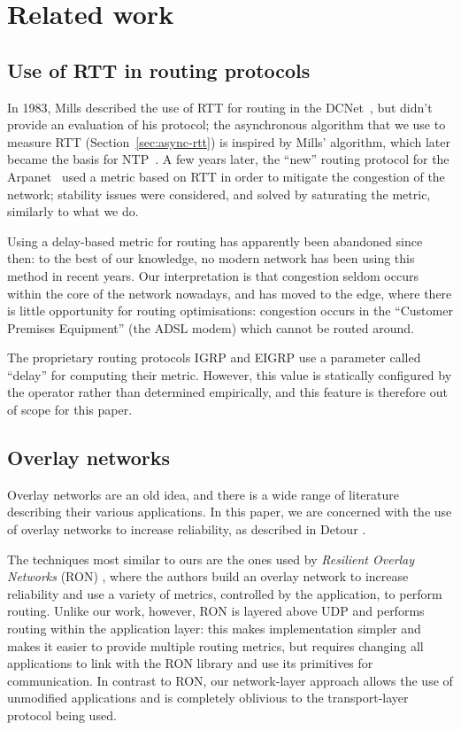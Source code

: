 \documentclass[conference,letterpaper]{IEEEtran}
\begin{document}
\section{Related work}

\subsection{Use of RTT in routing protocols}

In 1983, Mills described the use of RTT for routing in the
DCNet~\cite{mills83}, but didn't provide an evaluation of his
protocol; the asynchronous algorithm that we use to measure RTT
(Section~\ref{sec:async-rtt}) is inspired by Mills' algorithm, which
later became the basis for NTP~\cite{NTPv4}.  A few years later, the
``new'' routing protocol for the Arpanet~\cite{arpanet89} used
a metric based on RTT in order to mitigate the congestion of the
network; stability issues were considered, and solved by saturating
the metric, similarly to what we do.

Using a delay-based metric for routing has apparently been abandoned
since then: to the best of our knowledge, no modern network has been
using this method in recent years.  Our interpretation is that
congestion seldom occurs within the core of the network nowadays, and
has moved to the edge, where there is little opportunity for routing
optimisations: congestion occurs in the ``Customer Premises
Equipment'' (the ADSL modem) which cannot be routed around.

The proprietary routing protocols IGRP and EIGRP use a parameter
called ``delay'' for computing their metric.  However, this value is
statically configured by the operator rather than determined
empirically, and this feature is therefore out of scope for this
paper.

\subsection{Overlay networks}

Overlay networks are an old idea, and there is a wide range of
literature describing their various applications.  In this paper, we
are concerned with the use of overlay networks to increase
reliability, as described in Detour \cite{detour}.

The techniques most similar to ours are the ones used by
\emph{Resilient Overlay Networks} (RON) \cite{ron}, where the authors
build an overlay network to increase reliability and use a variety of
metrics, controlled by the application, to perform routing.  Unlike
our work, however, RON is layered above UDP and performs routing within
the application layer: this makes implementation simpler and makes it
easier to provide multiple routing metrics, but requires changing all
applications to link with the RON library and use its primitives for
communication.  In contrast to RON, our network-layer approach allows
the use of unmodified applications and is completely oblivious to the
transport-layer protocol being used.
\end{document}
